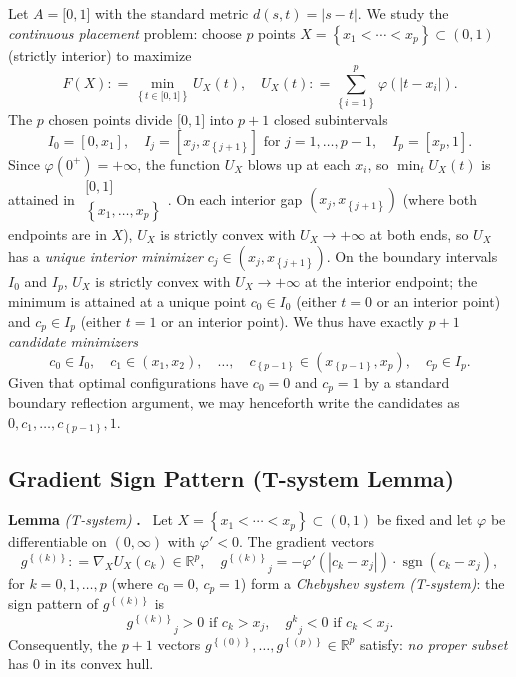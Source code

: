 \documentclass[
]{article}
\begin{document}
Let \(A = \lbrack 0,1\rbrack\) with the standard metric
\(d(s,t) = |s - t|\). We study the \emph{continuous placement} problem:
choose \(p\) points
\(X = \left\{ x_{1} < \cdots < x_{p} \right\} \subset (0,1)\) (strictly
interior) to maximize
\[F(X): = \min_{\left\{ t \in \lbrack 0,1\rbrack \right\}}U_{X}(t),\quad U_{X}(t): = \sum_{\left\{ i = 1 \right\}}^{p}\varphi(\left| t - x_{i} \right|).\]
The \(p\) chosen points divide \(\lbrack 0,1\rbrack\) into \(p + 1\)
closed subintervals
\[I_{0} = \left\lbrack 0,x_{1} \right\rbrack,\quad I_{j} = \left\lbrack x_{j},x_{\left\{ j + 1 \right\}} \right\rbrack\text{ for }j = 1,\ldots,p - 1,\quad I_{p} = \left\lbrack x_{p},1 \right\rbrack.\]
Since \(\varphi(0^{+}) = + \infty\), the function \(U_{X}\) blows up at
each \(x_{i}\), so \(\min_{t}U_{X}(t)\) is attained in
\(\begin{array}{r}
\lbrack 0,1\rbrack \\
\left\{ x_{1},\ldots,x_{p} \right\}
\end{array}\). On each interior gap
\(\left( x_{j},x_{\left\{ j + 1 \right\}} \right)\) (where both
endpoints are in \(X\)), \(U_{X}\) is strictly convex with
\(U_{X} \rightarrow + \infty\) at both ends, so \(U_{X}\) has a
\emph{unique interior minimizer}
\(c_{j} \in \left( x_{j},x_{\left\{ j + 1 \right\}} \right)\). On the
boundary intervals \(I_{0}\) and \(I_{p}\), \(U_{X}\) is strictly convex
with \(U_{X} \rightarrow + \infty\) at the interior endpoint; the
minimum is attained at a unique point \(c_{0} \in I_{0}\) (either
\(t = 0\) or an interior point) and \(c_{p} \in I_{p}\) (either
\(t = 1\) or an interior point). We thus have exactly \(p + 1\)
\emph{candidate minimizers}
\[c_{0} \in I_{0},\quad c_{1} \in \left( x_{1},x_{2} \right),\quad\ldots,\quad c_{\left\{ p - 1 \right\}} \in \left( x_{\left\{ p - 1 \right\}},x_{p} \right),\quad c_{p} \in I_{p}.\]
Given that optimal configurations have \(c_{0} = 0\) and \(c_{p} = 1\)
by a standard boundary reflection argument, we may henceforth write the
candidates as \(0,c_{1},\ldots,c_{\left\{ p - 1 \right\}},1\).

\subsection{Gradient Sign Pattern (T-system Lemma)}

\textbf{Lemma} \emph{(T-system)} \textbf{.}  Let
\(X = \left\{ x_{1} < \cdots < x_{p} \right\} \subset (0,1)\) be fixed
and let \(\varphi\) be differentiable on \((0,\infty)\) with
\(\varphi\prime < 0\). The gradient vectors
\[g^{\left\{ (k) \right\}}: = \nabla_{X}U_{X}\left( c_{k} \right) \in {\mathbb{R}}^{p},\quad{g^{\left\{ (k) \right\}}}_{j} = - \varphi\prime\left( \left| c_{k} - x_{j} \right| \right) \cdot \operatorname{sgn}(c_{k} - x_{j}),\]
for \(k = 0,1,\ldots,p\) (where \(c_{0} = 0\), \(c_{p} = 1\)) form a
\emph{Chebyshev system (T-system)}: the sign pattern of
\(g^{\left\{ (k) \right\}}\) is
\[{g^{\left\{ (k) \right\}}}_{j} > 0\text{ if }c_{k} > x_{j},\quad{g^{k}}_{j} < 0\text{ if }c_{k} < x_{j}.\]
Consequently, the \(p + 1\) vectors
\(g^{\left\{ (0) \right\}},\ldots,g^{\left\{ (p) \right\}} \in {\mathbb{R}}^{p}\)
satisfy: \emph{no proper subset} has \(0\) in its convex hull.
\end{document}
